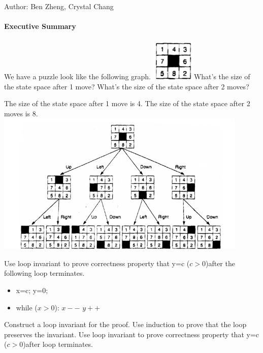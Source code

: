 \documentclass[solution, letterpaper]{cs20inclass}
\begin{document}

\noindent Author: Ben Zheng, Crystal Chang

\paragraph*{Executive Summary}

\problem We have a puzzle look like the following graph. 
\includegraphics[width=2cm]{initial}
\subproblem What's the size of the state space after 1 move?
\subproblem What's the size of the state space after 2 moves?

\begin{solution}
\subsolution The size of the state space after 1 move is 4.
\subsolution The size of the state space after 2 moves is 8.\\
\includegraphics[width=12cm]{final8}
\end{solution}

\problem Use loop invariant to prove correctness property that y=c ($c>0$)after the following loop terminates.
\begin{itemize}
\item x=c; y=0;
\item while ($x>0$):
\subitem $x--$
\subitem $y++$
\end{itemize}
\subproblem Construct a loop invariant for the proof.
\subproblem Use induction to prove that the loop preserves the invariant.
\subproblem Use loop invariant to prove correctness property that y=c ($c>0$)after loop terminates.
\end{document}
